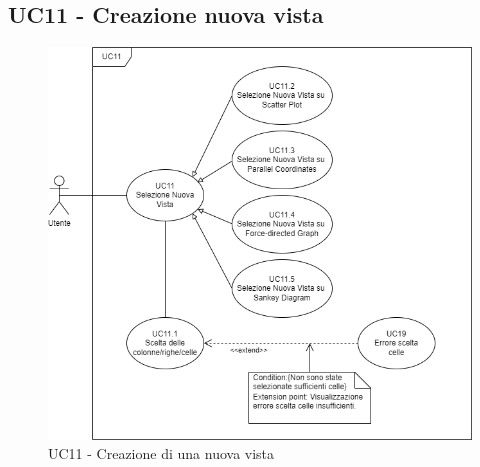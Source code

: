 \newpage

\subsection{UC11 - Creazione nuova vista}
\label{sec:UC11}
\begin{figure}[h!]
    \centering
    \includegraphics[scale=0.60]{../../assets/creazione_vista.png}
    \caption{UC11 - Creazione di una nuova vista}
\end{figure}
